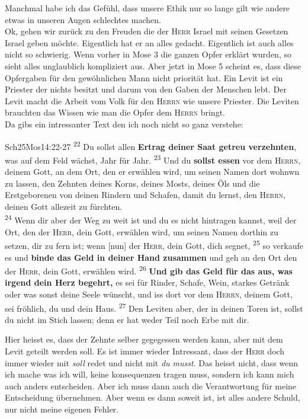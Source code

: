 Manchmal habe ich das Gefühl, dass unsere Ethik nur so lange gilt wie andere etwas in unseren Augen schlechtes machen.\\
Ok, gehen wir zurück zu den Freuden die der \textsc{Herr} Israel mit seinen Gesetzen Israel geben möchte. Eigentlich hat er an alles gedacht. Eigentlich ist auch alles nicht so schwierig. Wenn vorher in Mose 3 die ganzen Opfer erklärt wurden, so sieht alles unglaublich kompliziert aus. Aber jetzt in Mose 5 scheint es, dass diese Opfergaben für den gewöhnlichen Mann nicht priorität hat. Ein Levit ist ein Priester der nichts besitzt und darum von den Gaben der Menschen lebt. Der Levit macht die Arbeit vom Volk für den \textsc{Herrn} wie unsere Priester. Die Leviten brauchten das Wissen wie man die Opfer dem \textsc{Herrn} bringt.\\
Da gibs ein intressanter Text den ich noch nicht so ganz verstehe:
\begin{bibeltext}{Sch2}{5Mos}{14:22-27}
    \textsuperscript{22} Du sollst allen \textbf{Ertrag deiner Saat getreu verzehnten}, was auf dem Feld wächst, Jahr für Jahr. \textsuperscript{23} Und du \textbf{sollst essen} vor dem \textsc{Herrn}, deinem Gott, an dem Ort, den er erwählen wird, um seinen Namen dort wohnwn zu lassen, den Zehnten deines Korns, deines Mosts, deines Öls und die Erstgeborenen von deinen Rindern und Schafen, damit du lernst, den \textsc{Herrn}, deinen Gott allezeit zu fürchten.\\
    \textsuperscript{24} Wenn dir aber der Weg zu weit ist und du es nicht hintragen kannst, weil der Ort, den der \textsc{Herr}, dein Gott, erwählen wird, um seinen Namen dorthin zu setzen, dir zu fern ist; wenn [nun] der \textsc{Herr}, dein Gott, dich segnet, \textsuperscript{25} so verkaufe es und \textbf{binde das Geld in deiner Hand zusammen} und geh an den Ort den der \textsc{Herr}, dein Gott, erwählen wird. \textsuperscript{26} \textbf{Und gib das Geld für das aus, was irgend dein Herz begehrt,} es sei für Rinder, Schafe, Wein, starkes Getränk oder was sonst deine Seele wünscht, und iss dort vor dem \textsc{Herrn}, deinem Gott, sei fröhlich, du und dein Haus. \textsuperscript{27} Den Leviten aber, der in deinen Toren ist, sollst du nicht im Stich lassen; denn er hat weder Teil noch Erbe mit dir.
\end{bibeltext}
Hier heisst es, dass der Zehnte selber gegegessen werden kann, aber mit dem Levit geteilt werden soll. Es ist immer wieder Intressant, dass der \textsc{Herr} doch immer wieder mit \textit{soll} redet und nicht mit \textit{du musst}. Das heisst nicht, dass wenn ich mache was ich will, keine konsequenzen tragen muss, sondern ich kann mich auch anders entscheiden. Aber ich muss dann auch die Verantwortung für meine Entscheidung übernehmen. Aber wenn es dann soweit ist, ist alles andere Schuld, nur nicht meine eigenen Fehler.\\
